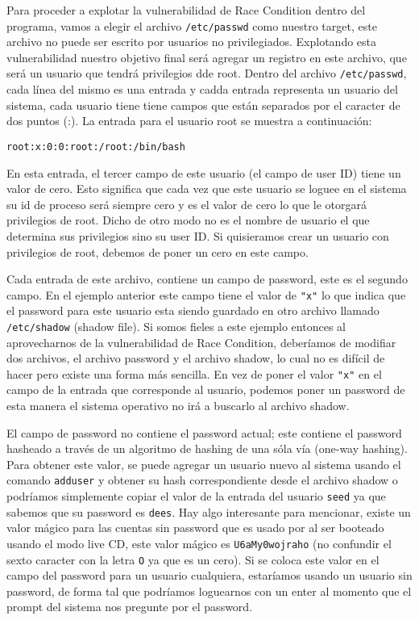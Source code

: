 Para proceder a explotar la vulnerabilidad de Race Condition dentro del programa, vamos a elegir el archivo \texttt{/etc/passwd} como nuestro target, este archivo no puede ser escrito por usuarios no privilegiados. Explotando esta vulnerabilidad nuestro objetivo final será agregar un registro en este archivo, que será un usuario que tendrá privilegios dde root.
Dentro del archivo \texttt{/etc/passwd}, cada línea del mismo es una entrada y cadda entrada representa un usuario del sistema, cada usuario tiene tiene campos que están separados por el caracter de dos puntos (:). La entrada para el usuario root se muestra a continuación:

\begin{lstlisting}
root:x:0:0:root:/root:/bin/bash
\end{lstlisting}

En esta entrada, el tercer campo de este usuario (el campo de user ID) tiene un valor de cero. Esto significa que cada vez que este usuario se loguee en el sistema su id de proceso será siempre cero y es el valor de cero lo que le otorgará privilegios de root. Dicho de otro modo no es el nombre de usuario el que determina sus privilegios sino su user ID. Si quisieramos crear un usuario con privilegios de root, debemos de poner un cero en este campo.

Cada entrada de este archivo, contiene un campo de password, este es el segundo campo. En el ejemplo anterior este campo tiene el valor de \texttt{"x"} lo que indica que el password para este usuario esta siendo guardado en otro archivo llamado \texttt{/etc/shadow} (shadow file). Si somos fieles a este ejemplo entonces al aprovecharnos de la vulnerabilidad de Race Condition, deberíamos de modifiar dos archivos, el archivo password y el archivo shadow, lo cual no es difícil de hacer pero existe una forma más sencilla. En vez de poner el valor \texttt{"x"} en el campo de la entrada que corresponde al usuario, podemos poner un password de esta manera el sistema operativo no irá a buscarlo al archivo shadow.

El campo de password no contiene el password actual; este contiene el password hasheado a través de un algoritmo de hashing de una sóla vía (one-way hashing). Para obtener este valor, se puede agregar un usuario nuevo al sistema usando el comando  \texttt{adduser} y obtener su hash correspondiente desde el archivo shadow o podríamos simplemente copiar el valor de la entrada del usuario \texttt{seed} ya que sabemos que su password es  \texttt{dees}.
Hay algo interesante para mencionar, existe un valor mágico para las cuentas sin password que es usado por \ubuntu al ser booteado usando el modo live CD, este valor mágico es \texttt{U6aMy0wojraho} (no confundir el sexto caracter con la letra \texttt{O} ya que es un cero). Si se coloca este valor en el campo del password para un usuario cualquiera, estaríamos usando un usuario sin password, de forma tal que podríamos loguearnos con un enter al momento que el prompt del sistema nos pregunte por el password.

